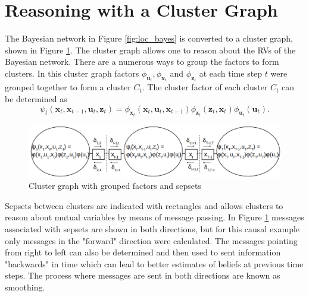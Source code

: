 \documentclass[12pt,oneside,openany,a4paper, %
afrikaans,english,
]{memoir}
\numberwithin{equation}{chapter}
\begin{document}
\section{Reasoning with a Cluster Graph}\label{sec:cluster}
The Bayesian network in Figure \ref{fig:loc_bayes} is converted to a cluster graph, shown in Figure \ref{fig:loc_cluster}. The cluster graph allows one to reason about the RVs of the Bayesian network. There are a numerous ways to group the factors to form clusters. In this cluster graph factors $\phi_{\bm{u}_t}, \phi_{\bm{x}_t}$ and $\phi_{\bm{z}_t}$  at each time step $t$  were grouped together to form a cluster $C_t$. The cluster factor of each cluster $C_t$ can be determined as
\begin{equation}
\psi_t(\bm{x}_t, \bm{x}_{t-1}, \bm{u}_t, \bm{z}_t) = \phi_{\bm{x}_t}(\bm{x}_t,\bm{u}_t,\bm{x}_{t-1})\phi_{\bm{z}_t}(\bm{z}_t,\bm{x}_t)\phi_{\bm{u}_t}(\bm{u}_t).
\end{equation}

\begin{figure}
  \includegraphics[width=\linewidth]{Figures/loc_clustergraph.png}
  \centering
  \caption{Cluster graph with grouped factors and sepsets}
  \label{fig:loc_cluster}
\end{figure}

Sepsets between clusters are indicated with rectangles and allows clusters to reason about mutual variables by means of message passing. In Figure \ref{fig:loc_cluster} messages associated with sepsets are shown in both directions, but for this causal example only messages in the "forward" direction were calculated. The messages pointing from right to left can also be determined and then used to sent information "backwards" in time which can lead to better estimates of beliefs at previous time steps. The process where messages are sent in both directions are known as smoothing.
\end{document}
